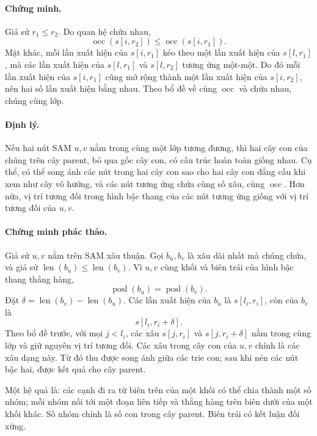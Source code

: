 \documentclass[11pt]{article}
\begin{document}
\paragraph{Chứng minh.}
Giả sử \(r_1\le r_2\). Do quan hệ chứa nhau,
\[
  \operatorname{occ}(s[i,r_2])\le \operatorname{occ}(s[i,r_1]).
\]
Mặt khác, mỗi lần xuất hiện của \(s[i,r_1]\) kéo theo một lần xuất hiện của
\(s[l,r_1]\), mà các lần xuất hiện của \(s[l,r_1]\) và \(s[l,r_2]\) tương ứng
một-một. Do đó mỗi lần xuất hiện của \(s[i,r_1]\) cũng mở rộng thành một lần
xuất hiện của \(s[i,r_2]\), nên hai số lần xuất hiện bằng nhau. Theo bổ đề về
cùng \(\operatorname{occ}\) và chứa nhau, chúng cùng lớp.

\paragraph{Định lý.}
Nếu hai nút SAM \(u,v\) nằm trong cùng một lớp tương đương, thì hai cây con của
chúng trên cây parent, bỏ qua gốc cây con, có cấu trúc hoàn toàn giống nhau.
Cụ thể, có thể song ánh các nút trong hai cây con sao cho hai cây con đẳng cấu
khi xem như cây vô hướng, và các nút tương ứng chứa cùng số xâu, cùng
\(\operatorname{occ}\). Hơn nữa, vị trí tương đối trong hình bậc thang của các
nút tương ứng giống với vị trí tương đối của \(u,v\).

\paragraph{Chứng minh phác thảo.}
Giả sử \(u,v\) nằm trên SAM xâu thuận. Gọi \(b_u,b_v\) là xâu dài nhất mà
chúng chứa, và giả sử \(\operatorname{len}(b_u)\le \operatorname{len}(b_v)\).
Vì \(u,v\) cùng khối và biên trái của hình bậc thang thẳng hàng,
\[
  \operatorname{posl}(b_u)=\operatorname{posl}(b_v).
\]
Đặt \(\delta=\operatorname{len}(b_v)-\operatorname{len}(b_u)\). Các lần xuất
hiện của \(b_u\) là \(s[l_i,r_i]\), còn của \(b_v\) là
\[
  s[l_i,r_i+\delta].
\]
Theo bổ đề trước, với mọi \(j<l_i\), các xâu \(s[j,r_i]\) và
\(s[j,r_i+\delta]\) nằm trong cùng lớp và giữ nguyên vị trí tương đối. Các xâu
trong cây con của \(u,v\) chính là các xâu dạng này. Từ đó thu được song ánh
giữa các trie con; sau khi nén các nút bậc hai, được kết quả cho cây parent.

Một hệ quả là: các cạnh đi ra từ biên trên của một khối có thể chia thành một
số nhóm; mỗi nhóm nối tới một đoạn liên tiếp và thẳng hàng trên biên dưới của
một khối khác. Số nhóm chính là số con trong cây parent. Biên trái có kết luận
đối xứng.
\end{document}
